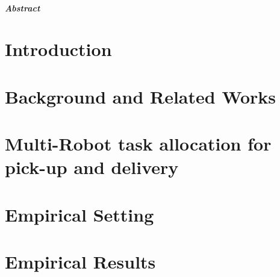 \documentclass[12pt, titlepage, a4paper]{book}
\begin{document}
\begin{frontespizio}
\Rientro {1.5cm}
\end{frontespizio}



% 
% 

\tableofcontents

\newpage

\paragraph{Abstract}


\chapter{Introduction}\label{chap:intro}



\chapter{Background and Related Works}\label{chap:related}


\chapter{Multi-Robot task allocation for pick-up and delivery}\label{chap:problem}




\chapter{Empirical Setting} \label{chap:ros}


\chapter{Empirical Results}\label{chap:results}


\end{document}
